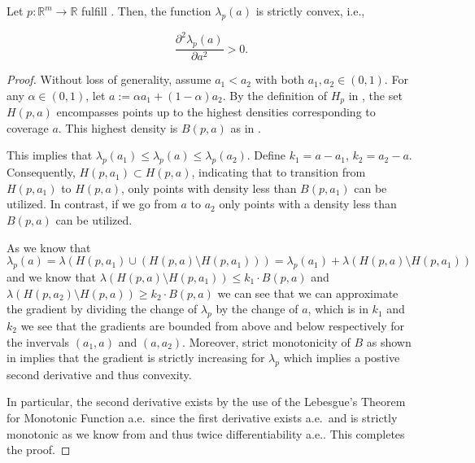 \begin{lemma}\label{lem:convexity}
    Let \(p: \mathbb{R}^m \to \mathbb{R}\) fulfill . Then, the function $\lambda_{p}(a)$ is strictly convex, i.e.,

    \begin{equation}
        \frac{\partial^2 \lambda_{p}(a)}{\partial a^2} > 0.
    \end{equation}

\end{lemma}
\begin{proof}
    Without loss of generality, assume \(a_1 < a_2\) with both \(a_1, a_2 \in (0,1)\). For any \(\alpha \in (0, 1)\), let \(a := \alpha a_1 + (1-\alpha) a_2\). By the definition of \(H_p\) in , the set \(H(p, a)\) encompasses points up to the highest densities corresponding to coverage \(a\). This highest density is $B(p, a)$ as in .

    This implies that \(\lambda_{p}(a_1) \leq \lambda_{p}(a) \leq \lambda_{p}(a_2)\). Define $k_1 = a-a_1$, $k_2 = a_2 - a$. Consequently, \(H(p, a_1) \subset H(p, a)\), indicating that to transition from \(H(p, a_1)\) to \(H(p, a)\), only points with density less than $B(p, a_1)$ can be utilized. In contrast, if we go from $a$ to $a_2$ only points with a density less than $B(p, a)$ can be utilized.

    As we know that
    \begin{equation}
        \lambda_p(a) = \lambda(H(p, a_1) \cup (H(p,a)\setminus H(p,a_1))) = \lambda_p(a_1) + \lambda(H(p,a)\setminus H(p, a_1))
    \end{equation}
    and we know that $\lambda(H(p,a)\setminus H(p, a_1)) \leq k_1 \cdot B(p, a)$ and $\lambda(H(p,a_2)\setminus H(p, a)) \geq k_2 \cdot B(p, a)$ we can see that we can approximate the gradient by dividing the change of $\lambda_p$ by the change of $a$, which is in $k_1$ and $k_2$ we see that the gradients are bounded from above and below respectively for the invervals $(a_1, a)$ and $(a, a_2)$. Moreover, strict monotonicity of $B$ as shown in  implies that the gradient is strictly increasing for $\lambda_p$ which implies a postive second derivative and thus convexity.

    In particular, the second derivative exists by the use of the Lebesgue's Theorem for Monotonic Function a.e.\ since the first derivative exists a.e.\ and is strictly monotonic as we know from  and thus twice differentiability a.e.. This completes the proof.
\end{proof}

